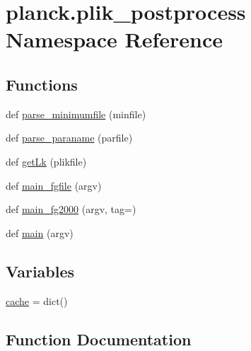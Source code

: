 \hypertarget{namespaceplanck_1_1plik__postprocess}{}\section{planck.\+plik\+\_\+postprocess Namespace Reference}
\label{namespaceplanck_1_1plik__postprocess}
\subsection*{Functions}
\begin{DoxyCompactItemize}
\item 
def \mbox{\hyperlink{namespaceplanck_1_1plik__postprocess_aa2e7d0756c0811893711c9aecf83baee}{parse\+\_\+minimumfile}} (minfile)
\item 
def \mbox{\hyperlink{namespaceplanck_1_1plik__postprocess_a7c4d0811ef982dbc43966c8a53f9f32a}{parse\+\_\+paraname}} (parfile)
\item 
def \mbox{\hyperlink{namespaceplanck_1_1plik__postprocess_a1134321ac736e3fb7a99ad4754a563dd}{get\+Lk}} (plikfile)
\item 
def \mbox{\hyperlink{namespaceplanck_1_1plik__postprocess_a3cd097f3d46e5e0635b5d5d6b738631c}{main\+\_\+fgfile}} (argv)
\item 
def \mbox{\hyperlink{namespaceplanck_1_1plik__postprocess_a81625cf708d7a89aad8e0aba301d99b6}{main\+\_\+fg2000}} (argv, tag=\textquotesingle{}\textquotesingle{})
\item 
def \mbox{\hyperlink{namespaceplanck_1_1plik__postprocess_a9ebb24e486ebd883116b6b49356dea52}{main}} (argv)
\end{DoxyCompactItemize}
\subsection*{Variables}
\begin{DoxyCompactItemize}
\item 
\mbox{\hyperlink{namespaceplanck_1_1plik__postprocess_a95414040d1006dd6941d68114c2b9c7e}{cache}} = dict()
\end{DoxyCompactItemize}


\subsection{Function Documentation}
\mbox{\label{namespaceplanck_1_1plik__postprocess_a1134321ac736e3fb7a99ad4754a563dd}} 
